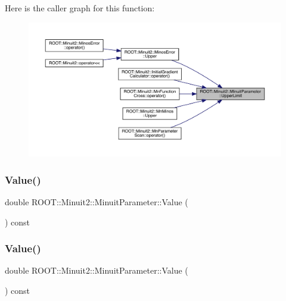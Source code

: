 Here is the caller graph for this function\+:\nopagebreak
\begin{figure}[H]
\begin{center}
\leavevmode
\includegraphics[width=350pt]{dd/dfb/classROOT_1_1Minuit2_1_1MinuitParameter_a285e254a9574807222d2a74bb05e18d9_icgraph}
\end{center}
\end{figure}
\mbox{\label{classROOT_1_1Minuit2_1_1MinuitParameter_ac77aed82006ba9e9598df49a1753d31c}} 
\subsubsection{\texorpdfstring{Value()}{Value()}\hspace{0.1cm}{\footnotesize\ttfamily [1/2]}}
{\footnotesize\ttfamily double R\+O\+O\+T\+::\+Minuit2\+::\+Minuit\+Parameter\+::\+Value (\begin{DoxyParamCaption}{ }\end{DoxyParamCaption}) const\hspace{0.3cm}{\ttfamily [inline]}}

\mbox{\label{classROOT_1_1Minuit2_1_1MinuitParameter_ac77aed82006ba9e9598df49a1753d31c}} 
\subsubsection{\texorpdfstring{Value()}{Value()}\hspace{0.1cm}{\footnotesize\ttfamily [2/2]}}
{\footnotesize\ttfamily double R\+O\+O\+T\+::\+Minuit2\+::\+Minuit\+Parameter\+::\+Value (\begin{DoxyParamCaption}{ }\end{DoxyParamCaption}) const\hspace{0.3cm}{\ttfamily [inline]}}

